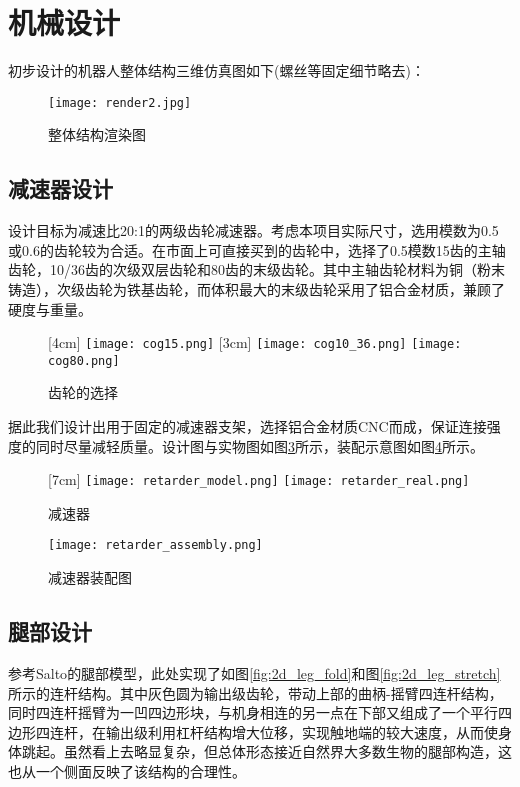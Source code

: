 \section{机械设计}
\label{sec:mechanical}
初步设计的机器人整体结构三维仿真图如下(螺丝等固定细节略去)：
\begin{figure}[H]
  \centering
  \texttt{[image: render2.jpg]}
  \caption{整体结构渲染图}
  \label{fig:render_v1}
\end{figure}
\subsection{减速器设计}
设计目标为减速比20:1的两级齿轮减速器。考虑本项目实际尺寸，选用模数为0.5或0.6的齿轮较为合适。在市面上可直接买到的齿轮中，选择了0.5模数15齿的主轴齿轮，10/36齿的次级双层齿轮和80齿的末级齿轮。其中主轴齿轮材料为铜（粉末铸造），次级齿轮为铁基齿轮，而体积最大的末级齿轮采用了铝合金材质，兼顾了硬度与重量。

\begin{figure}[H]
  \centering
  [4cm] 
    {\texttt{[image: cog15.png]}}
  \hspace{3em}
  [3cm]
      {\texttt{[image: cog10\_36.png]}}
  \hspace{4em}
      {\texttt{[image: cog80.png]}}
  \caption{齿轮的选择}
  \label{fig:cogs}

\end{figure}

据此我们设计出用于固定的减速器支架，选择铝合金材质CNC而成，保证连接强度的同时尽量减轻质量。设计图与实物图如图\ref{fig:retarder}所示，装配示意图如图\ref{fig:retarder_assembly}所示。
\begin{figure}[H]
  \centering
  [7cm] 
    {\texttt{[image: retarder\_model.png]}}
  \hspace{4em}
      {\texttt{[image: retarder\_real.png]}}
  \caption{减速器}
  \label{fig:retarder}
\end{figure}
\begin{figure}[H]
  \centering%
  \texttt{[image: retarder\_assembly.png]}
  \caption{减速器装配图}
  \label{fig:retarder_assembly}
\end{figure}
\subsection{腿部设计}
参考Salto\cite{Salto}的腿部模型，此处实现了如图\ref{fig:2d_leg_fold}和图\ref{fig:2d_leg_stretch}所示的连杆结构。其中灰色圆为输出级齿轮，带动上部的曲柄-摇臂四连杆结构，同时四连杆摇臂为一凹四边形块，与机身相连的另一点在下部又组成了一个平行四边形四连杆，在输出级利用杠杆结构增大位移，实现触地端的较大速度，从而使身体跳起。虽然看上去略显复杂，但总体形态接近自然界大多数生物的腿部构造，这也从一个侧面反映了该结构的合理性。

